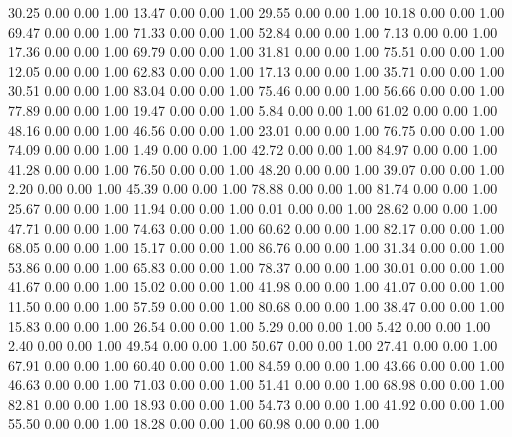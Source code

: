    30.25   0.00   0.00   1.00
   13.47   0.00   0.00   1.00
   29.55   0.00   0.00   1.00
   10.18   0.00   0.00   1.00
   69.47   0.00   0.00   1.00
   71.33   0.00   0.00   1.00
   52.84   0.00   0.00   1.00
    7.13   0.00   0.00   1.00
   17.36   0.00   0.00   1.00
   69.79   0.00   0.00   1.00
   31.81   0.00   0.00   1.00
   75.51   0.00   0.00   1.00
   12.05   0.00   0.00   1.00
   62.83   0.00   0.00   1.00
   17.13   0.00   0.00   1.00
   35.71   0.00   0.00   1.00
   30.51   0.00   0.00   1.00
   83.04   0.00   0.00   1.00
   75.46   0.00   0.00   1.00
   56.66   0.00   0.00   1.00
   77.89   0.00   0.00   1.00
   19.47   0.00   0.00   1.00
    5.84   0.00   0.00   1.00
   61.02   0.00   0.00   1.00
   48.16   0.00   0.00   1.00
   46.56   0.00   0.00   1.00
   23.01   0.00   0.00   1.00
   76.75   0.00   0.00   1.00
   74.09   0.00   0.00   1.00
    1.49   0.00   0.00   1.00
   42.72   0.00   0.00   1.00
   84.97   0.00   0.00   1.00
   41.28   0.00   0.00   1.00
   76.50   0.00   0.00   1.00
   48.20   0.00   0.00   1.00
   39.07   0.00   0.00   1.00
    2.20   0.00   0.00   1.00
   45.39   0.00   0.00   1.00
   78.88   0.00   0.00   1.00
   81.74   0.00   0.00   1.00
   25.67   0.00   0.00   1.00
   11.94   0.00   0.00   1.00
    0.01   0.00   0.00   1.00
   28.62   0.00   0.00   1.00
   47.71   0.00   0.00   1.00
   74.63   0.00   0.00   1.00
   60.62   0.00   0.00   1.00
   82.17   0.00   0.00   1.00
   68.05   0.00   0.00   1.00
   15.17   0.00   0.00   1.00
   86.76   0.00   0.00   1.00
   31.34   0.00   0.00   1.00
   53.86   0.00   0.00   1.00
   65.83   0.00   0.00   1.00
   78.37   0.00   0.00   1.00
   30.01   0.00   0.00   1.00
   41.67   0.00   0.00   1.00
   15.02   0.00   0.00   1.00
   41.98   0.00   0.00   1.00
   41.07   0.00   0.00   1.00
   11.50   0.00   0.00   1.00
   57.59   0.00   0.00   1.00
   80.68   0.00   0.00   1.00
   38.47   0.00   0.00   1.00
   15.83   0.00   0.00   1.00
   26.54   0.00   0.00   1.00
    5.29   0.00   0.00   1.00
    5.42   0.00   0.00   1.00
    2.40   0.00   0.00   1.00
   49.54   0.00   0.00   1.00
   50.67   0.00   0.00   1.00
   27.41   0.00   0.00   1.00
   67.91   0.00   0.00   1.00
   60.40   0.00   0.00   1.00
   84.59   0.00   0.00   1.00
   43.66   0.00   0.00   1.00
   46.63   0.00   0.00   1.00
   71.03   0.00   0.00   1.00
   51.41   0.00   0.00   1.00
   68.98   0.00   0.00   1.00
   82.81   0.00   0.00   1.00
   18.93   0.00   0.00   1.00
   54.73   0.00   0.00   1.00
   41.92   0.00   0.00   1.00
   55.50   0.00   0.00   1.00
   18.28   0.00   0.00   1.00
   60.98   0.00   0.00   1.00
